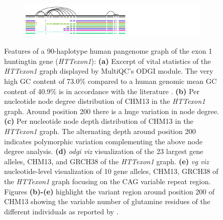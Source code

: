 \begin{figure}[ht!]
\begin{subfigure}{\linewidth}
        \label{fig:metrics-viz}
    \end{subfigure}
    \begin{subfigure}{\linewidth}
        \caption{}
        \centering
        \includegraphics[width=1.0\linewidth, trim=-0.4cm 0.4cm 3.15cm 0cm]{fig/metrics/chr4_pan_HTTex1_STR_xg_svg}
        \label{fig:metrics-str}
        \vspace{-0.5em}
    \end{subfigure}
	\caption{Features of a 90-haplotype human pangenome graph of the exon 1 huntingtin gene (\textit{HTTexon1}): \textbf{(a)} Excerpt of vital statistics of the \textit{HTTexon1} graph displayed by MultiQC's ODGI module. The very high GC content of 73.0\% compared to a human genomic mean GC content of 40.9\% \citep{Piovesan2019} is in accordance with the literature \citep{Neueder2017}. \textbf{(b)} Per nucleotide node degree distribution of CHM13 in the \textit{HTTexon1} graph. Around position 200 there is a huge variation in node degree. \textbf{(c)} Per nucleotide node depth distribution of CHM13 in the \textit{HTTexon1} graph. The alternating depth around position 200 indicates polymorphic variation complementing the above node degree analysis. \textbf{(d)} \textit{odgi viz} visualization of the 23 largest gene alleles, CHM13, and GRCH38 of the \textit{HTTexon1} graph. \textbf{(e)} \textit{vg viz} nucleotide-level visualization of 10 gene alleles, CHM13, GRCH38 of the \textit{HTTexon1} graph focusing on the CAG variable repeat region. Figures \textbf{(b)-(e)} highlight the variant region around position 200 of CHM13 showing the variable number of glutamine residues of the different individuals as reported by \citep{Nance1999}.}
	\label{fig:metrics}
\end{figure}
